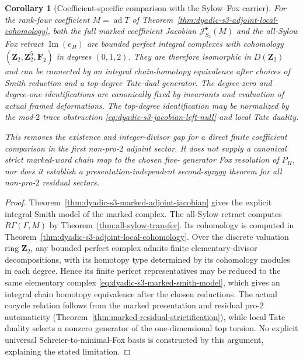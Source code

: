 \documentclass[11pt]{article}
\newtheorem{corollary}[theorem]{Corollary}
\theoremstyle{definition}
\begin{document}
\begin{corollary}[Coefficient-specific comparison with the Sylow--Fox carrier]
\label{cor:dyadic-s3-adjoint-smith-sylow-comparison}
For the rank-four coefficient
$M=\operatorname{ad}T$ of
Theorem~\ref{thm:dyadic-s3-adjoint-local-cohomology},
both the full marked coefficient
Jacobian
$\mathcal J^\bullet_{S_3}(M)$ and
the all-Sylow Fox retract
$\operatorname{Im}(e_H)$ are bounded
perfect integral complexes
with cohomology
$(\mathbf Z_2,\mathbf Z_2^5,\mathbf F_2)$
in degrees $(0,1,2)$.
They are therefore isomorphic in
$D(\mathbf Z_2)$ and can be
connected by an integral
chain-homotopy equivalence
\emph{after choices of Smith
reduction and a top-degree
Tate-dual generator}.
The degree-zero and degree-one
identifications are canonically
fixed by invariants and evaluation
of actual framed deformations.
The top-degree identification
may be normalized by the
mod-$2$ trace obstruction
\eqref{eq:dyadic-s3-jacobian-left-null}
and local Tate duality.

This removes the \emph{existence}
and integer-divisor gap for
a direct finite coefficient
comparison in the first
non-pro-$2$ adjoint sector.
It does \emph{not} supply a
canonical strict marked-word
chain map to the chosen five-
generator Fox resolution of $P_H$,
nor does it establish a
presentation-independent
second-syzygy theorem for
all non-pro-$2$ residual sectors.
\end{corollary}

\begin{proof}
Theorem~\ref{thm:dyadic-s3-marked-adjoint-jacobian}
gives the explicit integral Smith
model of the marked complex.
The all-Sylow retract computes
$R\Gamma(\Gamma,M)$ by
Theorem~\ref{thm:all-sylow-transfer}.
Its cohomology is computed in
Theorem~\ref{thm:dyadic-s3-adjoint-local-cohomology}.
Over the discrete valuation
ring $\mathbf Z_2$, any bounded
perfect complex admits finite
elementary-divisor decompositions,
with its homotopy type determined
by its cohomology modules in each
degree.  Hence its finite
perfect representatives may be
reduced to the same elementary
complex
\eqref{eq:dyadic-s3-marked-smith-model},
which gives an integral chain
homotopy equivalence after the
chosen reductions.
The actual cocycle relation
follows from the marked
presentation and residual
pro-$2$ automaticity
(Theorem~\ref{thm:marked-residual-strictification}),
while local Tate duality selects
a nonzero generator of the
one-dimensional top torsion.
No explicit universal
Schreier-to-minimal-Fox basis is
constructed by this argument,
explaining the stated limitation.
\end{proof}
\end{document}
